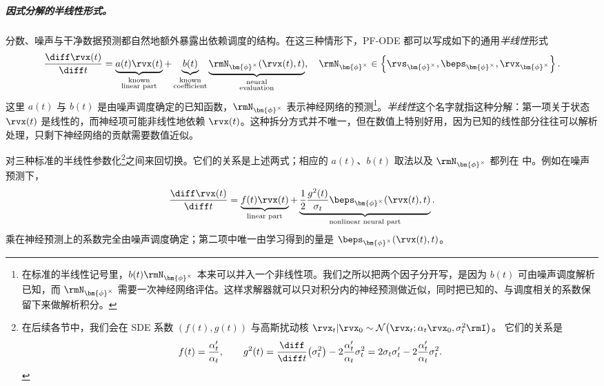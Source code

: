 \subparagraph{因式分解的半线性形式。}
分数、噪声与干净数据预测都自然地额外暴露出依赖调度的结构。在这三种情形下，PF-ODE 都可以写成如下的通用\emph{半线性}形式
\begin{equation}
\label{eq:general-semilinear-pfode}
\frac{\diff\rvx(t)}{\diff t}
=
\underbrace{
a(t)\rvx(t)
}_{\substack{\text{known}\\\text{linear part}}}
+
\underbrace{
b(t)
}_{\substack{\text{known}\\\text{coefficient}}}
\underbrace{
\rmN_{\bm{\phi}^\times}(\rvx(t),t)
}_{\substack{\text{neural}\\\text{evaluation}}},
\quad
\rmN_{\bm{\phi}^\times}
\in
\left\{
\rvs_{\bm{\phi}^\times},
\beps_{\bm{\phi}^\times},
\rvx_{\bm{\phi}^\times}
\right\}.
\end{equation}
这里 $a(t)$ 与 $b(t)$ 是由噪声调度确定的已知函数，$\rmN_{\bm{\phi}^\times}$ 表示神经网络的预测\footnote{在标准的半线性记号里，$b(t)\rmN_{\bm{\phi}^\times}$ 本来可以并入一个非线性项。我们之所以把两个因子分开写，是因为 $b(t)$ 可由噪声调度解析已知，而 $\rmN_{\bm{\phi}^\times}$ 需要一次神经网络评估。这样求解器就可以只对积分内的神经预测做近似，同时把已知的、与调度相关的系数保留下来做解析积分。}。\emph{半线性}这个名字就指这种分解：第一项关于状态 $\rvx(t)$ 是线性的，而神经项可能非线性地依赖 $\rvx(t)$。这种拆分方式并不唯一，但在数值上特别好用，因为已知的线性部分往往可以解析处理，只剩下神经网络的贡献需要数值近似。

对三种标准的半线性参数化\footnote{在后续各节中，我们会在 SDE 系数 $(f(t),g(t))$ 与高斯扰动核 $\rvx_t | \rvx_0
    \sim
    \mathcal{N}
    \bigl(
        \rvx_t;
        \alpha_t\rvx_0,
        \sigma_t^2\rmI
    \bigr)$。
它们的关系是
\[
    f(t)
    =
    \frac{\alpha_t'}{\alpha_t},
    \qquad
    g^2(t)
    =
    \frac{\diff}{\diff t}\bigl(\sigma_t^2\bigr)
    -
    2\frac{\alpha_t'}{\alpha_t}\sigma_t^2
    =
    2\sigma_t\sigma_t'
    -
    2\frac{\alpha_t'}{\alpha_t}\sigma_t^2.
\]
}之间来回切换。它们的关系是上述两式；相应的 $a(t)$、$b(t)$ 取法以及 $\rmN_{\bm{\phi}^\times}$ 都列在  中。例如在噪声预测下，
\begin{equation}
\label{eq:noise_pf_ode}
\frac{\diff\rvx(t)}{\diff t}
=
\underbrace{
f(t)\rvx(t)
}_{\text{linear part}}
+
\underbrace{
\frac{1}{2}\frac{g^2(t)}{\sigma_t}
\beps_{\bm{\phi}^\times}(\rvx(t),t)
}_{\text{nonlinear neural part}}.
\end{equation}
乘在神经预测上的系数完全由噪声调度确定；第二项中唯一由学习得到的量是 $\beps_{\bm{\phi}^\times}(\rvx(t),t)$。


